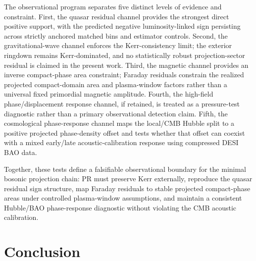 \documentclass[11pt]{article}
\begin{document}
The observational program separates five distinct levels of evidence and constraint. 
First, the quasar residual channel provides the strongest direct positive support, with the predicted negative luminosity-linked sign persisting across strictly anchored matched bins and estimator controls. 
Second, the gravitational-wave channel enforces the Kerr-consistency limit; the exterior ringdown remains Kerr-dominated, and no statistically robust projection-sector residual is claimed in the present work. 
Third, the magnetic channel provides an inverse compact-phase area constraint; Faraday residuals constrain the realized projected compact-domain area and plasma-window factors rather than a universal fixed primordial magnetic amplitude. 
Fourth, the high-field phase/displacement response channel, if retained, is treated as a pressure-test diagnostic rather than a primary observational detection claim. 
Fifth, the cosmological phase-response channel maps the local/CMB Hubble split to a positive projected phase-density offset and tests whether that offset can coexist with a mixed early/late acoustic-calibration response using compressed DESI BAO data.

Together, these tests define a falsifiable observational boundary for the minimal bosonic projection chain: PR must preserve Kerr externally, reproduce the quasar residual sign structure, map Faraday residuals to stable projected compact-phase areas under controlled plasma-window assumptions, and maintain a consistent Hubble/BAO phase-response diagnostic without violating the CMB acoustic calibration.

\section{Conclusion}
\label{sec:conclusion}
\end{document}
